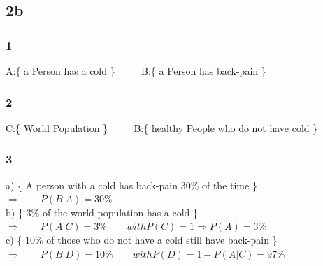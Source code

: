 \documentclass{article}
\begin{document}
\subsection*{2b}
\subsubsection*{1}
A:\{ a Person has a cold \} $\qquad$		B:\{ a Person has back-pain \}
\subsubsection*{2}
C:\{ World Population \} $\qquad$		B:\{ healthy People who do not have cold \}
\subsubsection*{3}
a) \{ A person with a cold has back-pain 30\% of the time \}\\[15pt]
$ \Rightarrow \qquad P(B|A) = 30\%$\\[15pt]
b) \{ 3\% of the world population has a cold \}\\[15pt]
$ \Rightarrow \qquad P(A|C) = 3\% \qquad with P(C)=1 \Rightarrow P(A) = 3\%$\\[15pt]
c) \{ 10\% of those who do not have a cold still have back-pain \}\\[15pt]
$ \Rightarrow \qquad P(B|D) = 10\% \qquad with P(D)=1-P(A|C)=97\% $\\[15pt]
\end{document}
